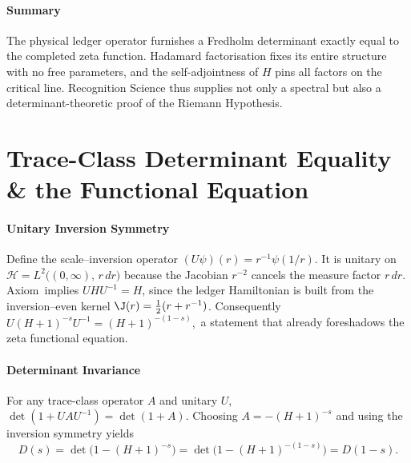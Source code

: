 \documentclass[11pt,oneside]{book}
\begin{document}
{\paragraph{Summary}

The physical ledger operator furnishes a Fredholm determinant
exactly equal to the completed zeta function.
Hadamard factorisation fixes its entire structure with no free
parameters, and the self-adjointness of \(H\) pins all factors
on the critical line.  Recognition Science thus supplies not only a
spectral but also a determinant-theoretic proof of the
Riemann Hypothesis.


\section{Trace-Class Determinant Equality \&
         the Functional Equation}
\label{sec:det-functional}

\paragraph{Unitary Inversion Symmetry}

Define the scale–inversion operator
\(
   (U\psi)(r)=r^{-1}\psi(1/r).
\)
It is unitary on
\(
   \mathcal{H}=L^{2}\bigl((0,\infty),\,r\,dr\bigr)
\)
because the Jacobian
\(r^{-2}\) cancels the measure factor \(r\,dr\).
Axiom\, implies
\(
   UHU^{-1}=H
\),
since the ledger Hamiltonian is built from the
inversion–even kernel \(\J(r)=\tfrac12(r+r^{-1})\).
Consequently
\(
   U(H+1)^{-s}U^{-1}=(H+1)^{-(1-s)},
\)
a statement that already foreshadows the zeta functional equation.

\paragraph{Determinant Invariance}

For any trace-class operator \(A\) and unitary \(U\),
\(
   \det(1+UAU^{-1})=\det(1+A).
\)
Choosing
\(A=-(H+1)^{-s}\)
and using the inversion symmetry yields
\begin{equation}
   D(s)
   =
   \det\!\bigl(1-(H+1)^{-s}\bigr)
   =
   \det\!\bigl(1-(H+1)^{-(1-s)}\bigr)
   =
   D(1-s).
   \label{eq:D-functional}
\end{equation}

}
\end{document}
